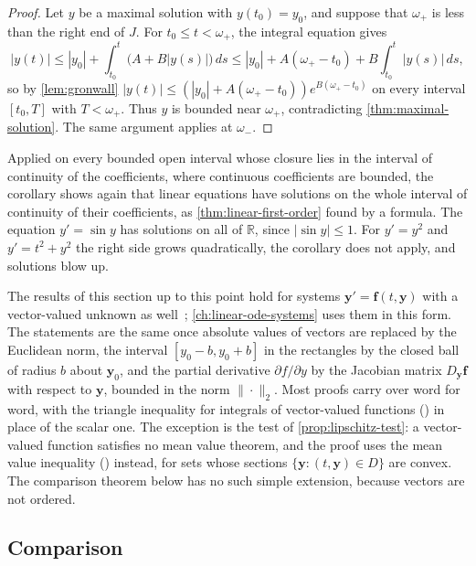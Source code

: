\begin{proof}
Let $y$ be a maximal solution with $y(t_0)=y_0$, and suppose that $\omega_+$ is less than the right end of $J$. For $t_0\le t<\omega_+$, the integral equation gives
\[
|y(t)|\le|y_0|+\int_{t_0}^t\bigl(A+B|y(s)|\bigr)\,ds\le|y_0|+A(\omega_+-t_0)+B\int_{t_0}^t|y(s)|\,ds ,
\]
so by \cref{lem:gronwall} $|y(t)|\le(|y_0|+A(\omega_+-t_0))e^{B(\omega_+-t_0)}$ on every interval $[t_0,T]$ with $T<\omega_+$. Thus $y$ is bounded near $\omega_+$, contradicting \cref{thm:maximal-solution}. The same argument applies at $\omega_-$.
\end{proof}

Applied on every bounded open interval whose closure lies in the interval of continuity of the coefficients, where continuous coefficients are bounded, the corollary shows again that linear equations have solutions on the whole interval of continuity of their coefficients, as \cref{thm:linear-first-order} found by a formula. The equation $y'=\sin y$ has solutions on all of $\mathbb R$, since $|\sin y|\le1$. For $y'=y^2$ and $y'=t^2+y^2$ the right side grows quadratically, the corollary does not apply, and solutions blow up.

The results of this section up to this point hold for systems $\mathbf y'=\mathbf f(t,\mathbf y)$ with a vector-valued unknown as well~\cite[Chap.~II]{hartman2002}; \cref{ch:linear-ode-systems} uses them in this form. The statements are the same once absolute values of vectors are replaced by the Euclidean norm, the interval $[y_0-b,y_0+b]$ in the rectangles by the closed ball of radius $b$ about $\mathbf y_0$, and the partial derivative $\partial f/\partial y$ by the Jacobian matrix $D_{\mathbf y}\mathbf f$ with respect to $\mathbf y$, bounded in the norm $\|\cdot\|_2$. Most proofs carry over word for word, with the triangle inequality for integrals of vector-valued functions () in place of the scalar one. The exception is the test of \cref{prop:lipschitz-test}: a vector-valued function satisfies no mean value theorem, and the proof uses the mean value inequality () instead, for sets whose sections $\{\mathbf y:(t,\mathbf y)\in D\}$ are convex. The comparison theorem below has no such simple extension, because vectors are not ordered.

\subsection{Comparison}

